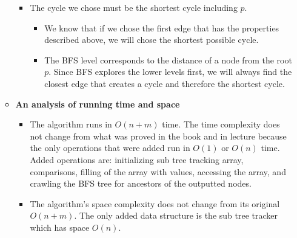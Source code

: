 \documentclass[letterpaper,11pt]{article}
\begin{document}
\begin{enumerate}
\begin{itemize}
\begin{itemize}
            \item The cycle we chose must be the shortest cycle including $p$.
                \begin{itemize}
                    \item We know that if we chose the first edge that has the 
                        properties described above, we will chose the shortest 
                        possible cycle. 
                    \item The BFS level corresponds to the distance of a node
                        from the root $p$. Since BFS explores the lower levels 
                        first, we will always find the closest edge that 
                        creates a cycle and therefore the shortest cycle.
                \end{itemize}

        \end{itemize}
    \item \textbf{An analysis of running time and space}
        \begin{itemize}
            \item The algorithm runs in $O\left( n + m \right) $ time. The time
                complexity does not change from what was proved in the book 
                and in lecture because the only operations that were added run
                in $O\left( 1 \right) $ or $O\left( n \right) $ time. Added operations are: initializing
                sub tree tracking array, comparisons, filling of the array
                with values, accessing the array, and crawling the BFS tree 
                for ancestors of the outputted nodes.
            \item The algorithm's space complexity does not change from its
                original $O\left( n + m \right)$. The only added data structure
                is the sub tree tracker which has space $O\left( n \right) $. 
        \end{itemize}
\end{itemize}





\end{enumerate}
\end{document}

